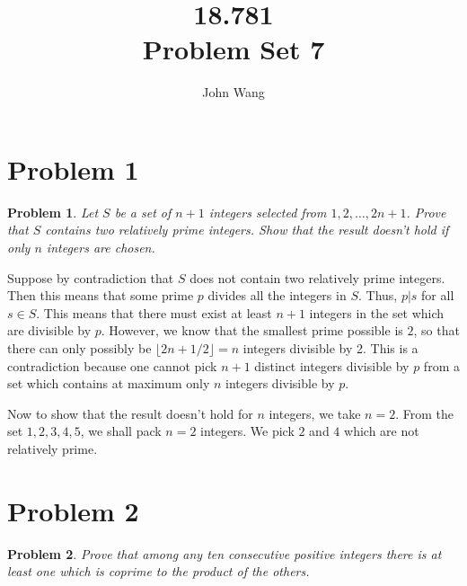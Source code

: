 \documentclass[psamsfonts]{amsart}
\title{18.781 \\
Problem Set 7}
\author{John Wang}
\newtheorem{prob}{Problem}[section]
\newenvironment{sol}{{\bfseries Solution}}{\qedsymbol}
\theoremstyle{definition}
\theoremstyle{remark}
\numberwithin{equation}{section}
\begin{document}
\maketitle

\section{Problem 1}

\begin{prob}
Let $S$ be a set of $n + 1$ integers selected from $1, 2, \ldots, 2n + 1 $. Prove that $S$ contains two relatively prime integers. Show that the result doesn't hold if only $n$ integers are chosen.
\end{prob}

\begin{sol}
Suppose by contradiction that $S$ does not contain two relatively prime integers. Then this means that some prime $p$ divides all the integers in $S$. Thus, $p | s$ for all $s \in S$. This means that there must exist at least $n + 1$ integers in the set which are divisible by $p$. However, we know that the smallest prime possible is $2$, so that there can only possibly be $\lfloor 2n + 1 / 2 \rfloor = n$ integers divisible by 2. This is a contradiction because one cannot pick $n + 1$ distinct integers divisible by $p$ from a set which contains at maximum only $n$ integers divisible by $p$. 

Now to show that the result doesn't hold for $n$ integers, we take $n = 2$. From the set $1,2,3,4,5$, we shall pack $n=2$ integers. We pick $2$ and $4$ which are not relatively prime. 
\end{sol}

\section{Problem 2}

\begin{prob}
Prove that among any ten consecutive positive integers there is at least one which is coprime to the product of the others.
\end{prob}
\end{document}
